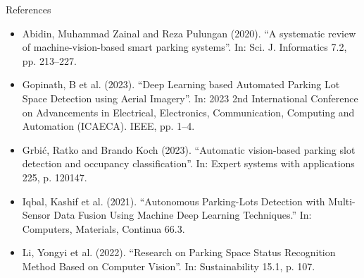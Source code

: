 \documentclass{beamer}
\begin{document}
\begin{frame}{References}
    \begin{itemize}
        \item Abidin, Muhammad Zainal and Reza Pulungan (2020). “A systematic review of machine-vision-based smart parking systems”. In: Sci. J. Informatics 7.2, pp. 213–227.
        \item Gopinath, B et al. (2023). “Deep Learning based Automated Parking Lot Space Detection using Aerial Imagery”. In: 2023 2nd International Conference on Advancements in Electrical, Electronics, Communication, Computing and Automation (ICAECA). IEEE, pp. 1–4.
        \item Grbić, Ratko and Brando Koch (2023). “Automatic vision-based parking slot detection and occupancy classification”. In: Expert systems with applications 225, p. 120147.
        \item Iqbal, Kashif et al. (2021). “Autonomous Parking-Lots Detection with Multi-Sensor Data Fusion Using Machine Deep Learning Techniques.” In: Computers, Materials, Continua 66.3.
        \item Li, Yongyi et al. (2022). “Research on Parking Space Status Recognition Method Based on Computer Vision”. In: Sustainability 15.1, p. 107.
    \end{itemize}
\end{frame}
\end{document}
